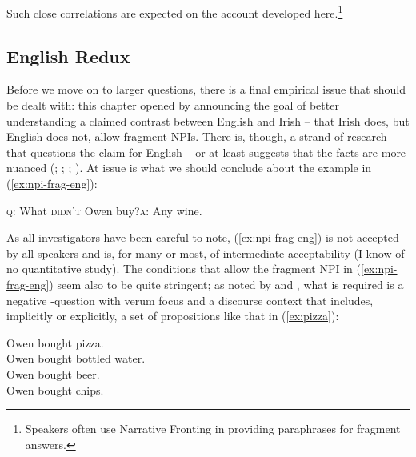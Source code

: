 \documentclass[output=paper,colorlinks,citecolor=brown]{langscibook}
\begin{document}

\noindent Such close correlations are expected on the account developed here.\footnote{Speakers often use Narrative Fronting in providing paraphrases for fragment answers.}

\subsection{English Redux}
\label{sec:english-redux}

Before we move on to larger questions, there is a final empirical issue that should be dealt with: this chapter opened by announcing the goal of better understanding a claimed contrast between English and Irish -- that Irish does, but English does not, allow fragment NPIs. There is, though, a strand of research that questions the claim for English -- or at least suggests that the facts are more nuanced (\cite{marcel-et-al:00}; \cite{valmala:07}; \cite{weir-diss}; \cite{weir:15}). At issue is what we should conclude about the example in (\ref{ex:npi-frag-eng}):

\ea\label{ex:buy}
\textsc{q}: What \textsc{didn't} Owen buy?\quad\textsc{a}: Any wine.\label{ex:npi-frag-eng}
\z
{}

\noindent As all investigators have been careful to note, (\ref{ex:npi-frag-eng}) is not accepted by all speakers and is, for many or most, of intermediate acceptability (I know of no quantitative study). The conditions that allow the fragment NPI in (\ref{ex:npi-frag-eng}) seem also to be quite stringent; as noted by \citet[fn3, 44--45]{marcel-et-al:00} and \citet[167--171]{weir-diss}, what is required is a negative \WH-question with verum focus and a discourse context that includes, implicitly or explicitly, a set of propositions like that in (\ref{ex:pizza}): 

\ea\label{ex:pizza}
Owen bought pizza. \\
Owen bought bottled water. \\
Owen bought beer. \\
Owen bought chips.
\z
\end{document}
